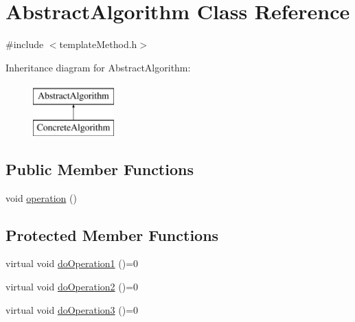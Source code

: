 \hypertarget{class_abstract_algorithm}{\section{Abstract\-Algorithm Class Reference}
\label{class_abstract_algorithm}
}


{\ttfamily \#include $<$template\-Method.\-h$>$}

Inheritance diagram for Abstract\-Algorithm\-:\begin{figure}[H]
\begin{center}
\leavevmode
\includegraphics[height=2.000000cm]{class_abstract_algorithm}
\end{center}
\end{figure}
\subsection*{Public Member Functions}
\begin{DoxyCompactItemize}
\item 
void \hyperlink{class_abstract_algorithm_a7d8715fc465cc79c1131832989fbdf82}{operation} ()
\end{DoxyCompactItemize}
\subsection*{Protected Member Functions}
\begin{DoxyCompactItemize}
\item 
virtual void \hyperlink{class_abstract_algorithm_a860e4d98800f4dceb5721d835d5ceeb0}{do\-Operation1} ()=0
\item 
virtual void \hyperlink{class_abstract_algorithm_ae758fdd33b4bd3ba12c9d49ce6fad741}{do\-Operation2} ()=0
\item 
virtual void \hyperlink{class_abstract_algorithm_abef35c1f2097de614a14c2daa24b16c5}{do\-Operation3} ()=0
\end{DoxyCompactItemize}


